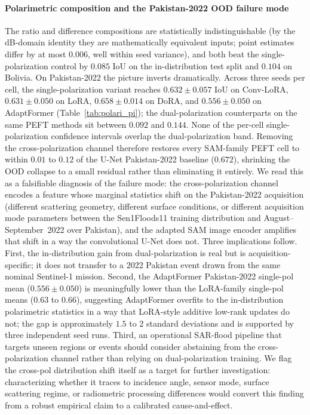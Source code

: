 \documentclass[conference]{IEEEtran}
\begin{document}
\paragraph{Polarimetric composition and the Pakistan-2022 OOD failure mode}
The ratio and difference compositions are statistically indistinguishable (by the dB-domain identity they are mathematically equivalent inputs; point estimates differ by at most $0.006$, well within seed variance), and both beat the single-polarization control by $0.085$ IoU on the in-distribution test split and $0.104$ on Bolivia. On Pakistan-2022 the picture inverts dramatically. Across three seeds per cell, the single-polarization variant reaches $0.632 \pm 0.057$ IoU on Conv-LoRA, $0.631 \pm 0.050$ on LoRA, $0.658 \pm 0.014$ on DoRA, and $0.556 \pm 0.050$ on AdaptFormer (Table~\ref{tab:polari_pi}); the dual-polarization counterparts on the same PEFT methods sit between $0.092$ and $0.144$. None of the per-cell single-polarization confidence intervals overlap the dual-polarization band. Removing the cross-polarization channel therefore restores every SAM-family PEFT cell to within $0.01$ to $0.12$ of the U-Net Pakistan-2022 baseline ($0.672$), shrinking the OOD collapse to a small residual rather than eliminating it entirely. We read this as a falsifiable diagnosis of the failure mode: the cross-polarization channel encodes a feature whose marginal statistics shift on the Pakistan-2022 acquisition (different scattering geometry, different surface conditions, or different acquisition mode parameters between the Sen1Floods11 training distribution and August--September~2022 over Pakistan), and the adapted SAM image encoder amplifies that shift in a way the convolutional U-Net does not. Three implications follow. First, the in-distribution gain from dual-polarization is real but is acquisition-specific; it does not transfer to a 2022 Pakistan event drawn from the same nominal Sentinel-1 mission. Second, the AdaptFormer Pakistan-2022 single-pol mean ($0.556 \pm 0.050$) is meaningfully lower than the LoRA-family single-pol means ($0.63$ to $0.66$), suggesting AdaptFormer overfits to the in-distribution polarimetric statistics in a way that LoRA-style additive low-rank updates do not; the gap is approximately $1.5$ to $2$ standard deviations and is supported by three independent seed runs. Third, an operational SAR-flood pipeline that targets unseen regions or events should consider abstaining from the cross-polarization channel rather than relying on dual-polarization training. We flag the cross-pol distribution shift itself as a target for further investigation: characterizing whether it traces to incidence angle, sensor mode, surface scattering regime, or radiometric processing differences would convert this finding from a robust empirical claim to a calibrated cause-and-effect.
\end{document}
